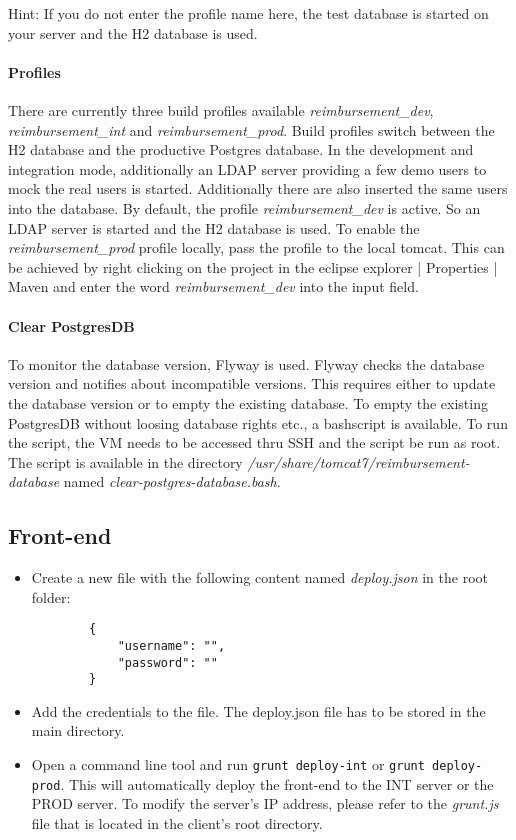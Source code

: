 Hint: If you do not enter the profile name here, the test database is started on your server and the H2 database is used.

\paragraph{Profiles}
There are currently three build profiles available \textit{reimbursement\_dev},  \textit{reimbursement\_int} and \textit{reimbursement\_prod}. Build profiles switch between the H2 database and the productive Postgres database. In the development and integration mode, additionally an LDAP server providing a few demo users to mock the real users is started. Additionally there are also inserted the same users into the database. \newline
By default, the profile \textit{reimbursement\_dev} is active. So an LDAP server is started and the H2 database is used. To enable the \textit{reimbursement\_prod} profile locally, pass the profile to the local tomcat. This can be achieved by right clicking on the project in the eclipse explorer | Properties | Maven and enter the word \textit{reimbursement\_dev} into the input field.

\paragraph{Clear PostgresDB}
\label{sec:clear-postgresdb}
To monitor the database version, Flyway is used. Flyway checks the database version and notifies about incompatible versions. This requires either to update the database version or to empty the existing database. To empty the existing PostgresDB without loosing database rights etc., a bashscript is available. To run the script, the VM needs to be accessed thru SSH and the script be run as root. The script is available in the directory \textit{/usr/share/tomcat7/reimbursement-database} named \textit{clear-postgres-database.bash}.

\subsection{Front-end}

\begin{itemize}

    \item Create a new file with the following content named \textit{deploy.json} in the root folder:
    \begin{lstlisting}
        {
            "username": "",
            "password": ""
        }
    \end{lstlisting}
    \item Add the credentials to the file. The deploy.json file has to be stored in the main directory.
    \item Open a command line tool and run \texttt{grunt deploy-int} or \texttt{grunt deploy-prod}. This will automatically deploy the front-end to the INT server or the PROD server. To modify the server's IP address, please refer to the \textit{grunt.js} file that is located in the client's root directory. 
    
\end{itemize}

